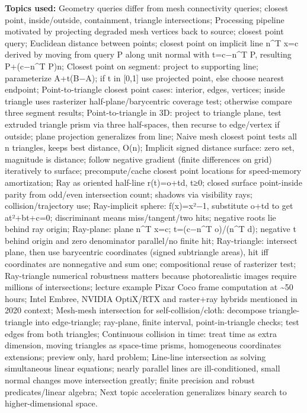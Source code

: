 \textbf{Topics used:} Geometry queries differ from mesh connectivity queries; closest point, inside/outside, containment, triangle intersections; Processing pipeline motivated by projecting degraded mesh vertices back to source; closest point query; Euclidean distance between points; closest point on implicit line n\^{}T x=c derived by moving from query P along unit normal with t=c−n\^{}T P, resulting P+(c−n\^{}T P)n; Closest point on segment: project to supporting line; parameterize A+t(B−A); if t in {[}0,1{]} use projected point, else choose nearest endpoint; Point-to-triangle closest point cases: interior, edges, vertices; inside triangle uses rasterizer half-plane/barycentric coverage test; otherwise compare three segment results; Point-to-triangle in 3D: project to triangle plane, test extruded triangle prism via three half-spaces, then recurse to edge/vertex if outside; plane projection generalizes from line; Naive mesh closest point tests all n triangles, keeps best distance, O(n); Implicit signed distance surface: zero set, magnitude is distance; follow negative gradient (finite differences on grid) iteratively to surface; precompute/cache closest point locations for speed-memory amortization; Ray as oriented half-line r(t)=o+td, t≥0; closed surface point-inside parity from odd/even intersection count; shadows via visibility rays; collision/trajectory use; Ray-implicit sphere: f(x)=\textbar\textbar x\textbar\textbar²−1, substitute o+td to get at²+bt+c=0; discriminant means miss/tangent/two hits; negative roots lie behind ray origin; Ray-plane: plane n\^{}T x=c; t=(c−n\^{}T o)/(n\^{}T d); negative t behind origin and zero denominator parallel/no finite hit; Ray-triangle: intersect plane, then use barycentric coordinates (signed subtriangle areas), hit iff coordinates are nonnegative and sum one; compositional reuse of rasterizer test; Ray-triangle numerical robustness matters because photorealistic images require millions of intersections; lecture example Pixar Coco frame computation at \textasciitilde50 hours; Intel Embree, NVIDIA OptiX/RTX and raster+ray hybrids mentioned in 2020 context; Mesh-mesh intersection for self-collision/cloth: decompose triangle-triangle into edge-triangle; ray-plane, finite interval, point-in-triangle checks; test edges from both triangles; Continuous collision in time: treat time as extra dimension, moving triangles as space-time prisms, homogeneous coordinates extensions; preview only, hard problem; Line-line intersection as solving simultaneous linear equations; nearly parallel lines are ill-conditioned, small normal changes move intersection greatly; finite precision and robust predicates/linear algebra; Next topic acceleration generalizes binary search to higher-dimensional space.

